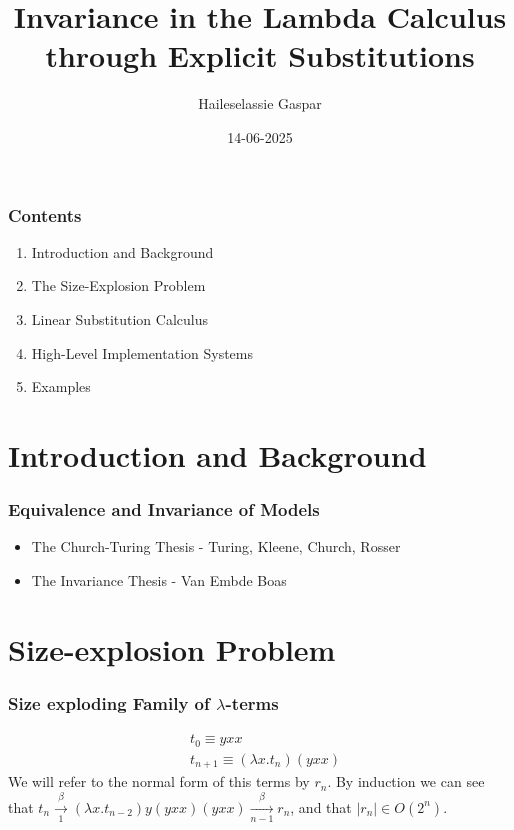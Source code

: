 \documentclass{beamer}
\title{Invariance in the Lambda Calculus through Explicit Substitutions}
\author{Haileselassie Gaspar}
\institute{Vrije Universiteit Amsterdam}
\date{14-06-2025}
\begin{document}
\frame{\titlepage}

\begin{frame}
  \frametitle{Contents}
  \begin{enumerate}
    \item Introduction and Background
    \item The Size-Explosion Problem
    \item Linear Substitution Calculus
    \item High-Level Implementation Systems
    \item Examples
  \end{enumerate}
\end{frame}
\section{Introduction and Background}
\begin{frame}
  \frametitle{Equivalence and Invariance of Models}
  \begin{itemize}
    \item The Church-Turing Thesis - Turing, Kleene, Church, Rosser
    \item The Invariance Thesis - Van Embde Boas
  \end{itemize}
\end{frame}
\section{Size-explosion Problem}
\begin{frame}
  \frametitle{Size exploding Family of $\lambda$-terms}
  \begin{equation}
    \begin{split}
      & t_{0} \equiv yxx \\
      & t_{n+1} \equiv (\lambda x.t_{n})(yxx)
    \end{split}
  \end{equation}
  We will refer to the normal form of this terms by $r_{n}$.
  By induction we can see that $t_{n} \xrightarrow[1]{\beta} (\lambda x .t_{n - 2})y(yxx)(yxx) \xrightarrow[n-1]{\beta} r_{n}$, and that $|r_{n}| \in O(2^{n})$.
\end{frame}
\end{document}
